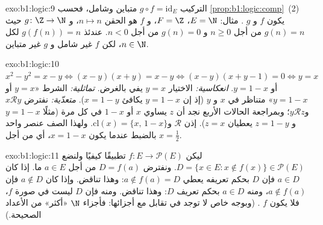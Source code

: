 \begin{solution}{exo:b1:logic:9}
التركيب $g \circ f = \mathrm{id}_E$ متباين وشامل، فحسب
\cref{prop:b1:logic:comp}~(2) يكون $f$  و $g$ .
مثال: $E = \N$، $F = \Z$، و $f$ هو الحقن $n \mapsto n$، و
$g \colon \Z \to \N$ حيث $g(n) = n$ من أجل $n \geq 0$ و $g(n) = 0$
من أجل $n < 0$. عندئذ $g(f(n)) = n$ لكل $n \in \N$، لكن $f$ غير
شامل و $g$ غير متباين.
\end{solution}

\begin{solution}{exo:b1:logic:10}
$x^2 - y^2 = x - y \iff (x - y)(x + y) = x - y \iff (x - y)(x + y - 1)
= 0 \iff y = x$ أو $y = 1 - x$. \emph{انعكاسية:} الاختيار $y = x$ يفي بالغرض.
\emph{تماثلية:} الشرط «$y = x$ أو $y = 1 - x$»
متناظر في $x$ و $y$ (إذ إن $y = 1 - x$ يكافئ $x = 1 - y$).
\emph{متعدّية:} نفترض $x \mathbin{\mathcal{R}} y$ و$y
\mathbin{\mathcal{R}} z$؛ وبمراجعة الحالات الأربع نجد أن $z$ يساوي $x$
أو $1 - x$ في كل مرة (مثلًا $y = 1 - x$ و $z = 1 - y$ يعطيان $z = x$).
إذن $\mathcal{R}$  و$\mathrm{cl}(x) =
\{x,\, 1 - x\}$. ولهذا الصف عنصر واحد بالضبط عندما يكون $x = 1 - x$،
أي من أجل $x = \frac12$.
\end{solution}

\begin{solution}{exo:b1:logic:11}
ليكن $f \colon E \to \mathcal{P}(E)$ تطبيقًا كيفيًا ولنضع
$D = \{x \in E : x \notin f(x)\} \in \mathcal{P}(E)$. ونفترض $D =
f(a)$ من أجل $a \in E$ ما. إذا كان $a \in D$ فإن $D$ بحكم تعريفه
يعطي $a \notin f(a) = D$: وهذا تناقض. وإذا كان $a \notin D$ فإن $a \notin
f(a)$، ومنه $a \in D$ بحكم تعريف $D$: وهذا تناقض. ومنه فإن $D$
ليست في صورة $f$، فلا يكون $f$ . (وبوجه خاص لا توجد 
في تقابل مع  أجزائها: فأجزاء $\N$ «أكثر» من الأعداد الصحيحة.)
\end{solution}

